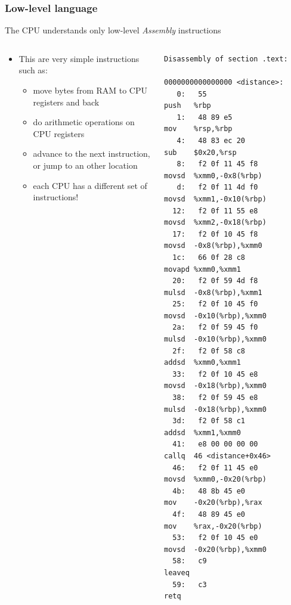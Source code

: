 \documentclass[handout]{beamer}
\begin{document}
\begin{frame}[fragile]
  \frametitle{Low-level language}
  \begin{block}{}
  The CPU understands only low-level \emph{Assembly} instructions
  \end{block}
  \begin{columns}
  \begin{column}[T]{0.4\textwidth}
  \begin{itemize}
  \item This are very simple instructions such as:
        \begin{itemize} 
        \item move bytes from RAM to CPU registers and back
        \item do arithmetic operations on CPU registers
        \item advance to the next instruction, or jump to an other
              location
        \item each CPU has a different set of instructions!
        \end{itemize}
  \end{itemize}
  \end{column}
  \begin{column}[T]{0.6\textwidth}
  \lstset{language=C++,basicstyle=\tiny\ttfamily}
  \begin{lstlisting}
Disassembly of section .text:

0000000000000000 <distance>:
   0:	55                   	push   %rbp
   1:	48 89 e5             	mov    %rsp,%rbp
   4:	48 83 ec 20          	sub    $0x20,%rsp
   8:	f2 0f 11 45 f8       	movsd  %xmm0,-0x8(%rbp)
   d:	f2 0f 11 4d f0       	movsd  %xmm1,-0x10(%rbp)
  12:	f2 0f 11 55 e8       	movsd  %xmm2,-0x18(%rbp)
  17:	f2 0f 10 45 f8       	movsd  -0x8(%rbp),%xmm0
  1c:	66 0f 28 c8          	movapd %xmm0,%xmm1
  20:	f2 0f 59 4d f8       	mulsd  -0x8(%rbp),%xmm1
  25:	f2 0f 10 45 f0       	movsd  -0x10(%rbp),%xmm0
  2a:	f2 0f 59 45 f0       	mulsd  -0x10(%rbp),%xmm0
  2f:	f2 0f 58 c8          	addsd  %xmm0,%xmm1
  33:	f2 0f 10 45 e8       	movsd  -0x18(%rbp),%xmm0
  38:	f2 0f 59 45 e8       	mulsd  -0x18(%rbp),%xmm0
  3d:	f2 0f 58 c1          	addsd  %xmm1,%xmm0
  41:	e8 00 00 00 00       	callq  46 <distance+0x46>
  46:	f2 0f 11 45 e0       	movsd  %xmm0,-0x20(%rbp)
  4b:	48 8b 45 e0          	mov    -0x20(%rbp),%rax
  4f:	48 89 45 e0          	mov    %rax,-0x20(%rbp)
  53:	f2 0f 10 45 e0       	movsd  -0x20(%rbp),%xmm0
  58:	c9                   	leaveq 
  59:	c3                   	retq   
  \end{lstlisting}
  \end{column}
  \end{columns}
\end{frame}
\end{document}
